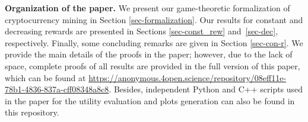 
\smallskip
\noindent
{\bf Organization of the paper.} We present our game-theoretic formalization of cryptocurrency mining in Section \ref{sec-formalization}. Our results for constant and decreasing rewards are presented in Sections \ref{sec-const_rew} and~\ref{sec-dec}, respectively. Finally, some concluding remarks are given in Section \ref{sec-con-r}. We provide the main details of the proofs in the paper; however, due to the lack of space, complete proofs of all results are provided in the full version of this paper, which can be found at \url{https://anonymous.4open.science/repository/08eff11e-78b1-4836-837a-cff08348a8c8}. Besides, independent Python and C++ scripts used in the paper for the utility evaluation and plots generation can also be found in this repository.




